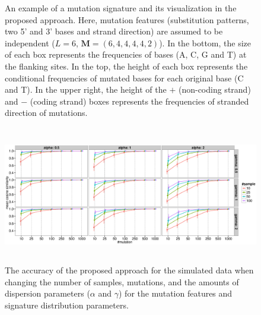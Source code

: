 \begin{figure}
\begin{minipage}{0.4\textwidth}
\begin{flushleft}
\end{flushleft}
\end{minipage}
\caption{An example of a mutation signature and its visualization in the proposed approach.
Here, mutation features (substitution patterns, two 5' and 3' bases and strand direction) 
are assumed to be independent ($L=6$, $\bm{M} = (6, 4, 4, 4, 4, 2)$).
In the bottom, the size of each box represents the frequencies of bases (A, C, G and T) at the flanking sites.
In the top, the height of each box represents the conditional frequencies of mutated bases for each original base (C and T).
In the upper right, the height of the $+$ (non-coding strand) and $-$ (coding strand) boxes represents the frequencies of  stranded direction of mutations.
}
\label{mutSig_example}

\end{figure}


\clearpage

\begin{figure}[b]
\centering
\includegraphics[width=16cm,height=6cm]{simulation_result.eps}
\caption{The accuracy of the proposed approach for the simulated data 
when changing the number of samples, mutations, 
and the amounts of dispersion parameters ($\alpha$ and $\gamma$) for the mutation features and signature distribution parameters.
}
\label{sim_facet}
\end{figure}



